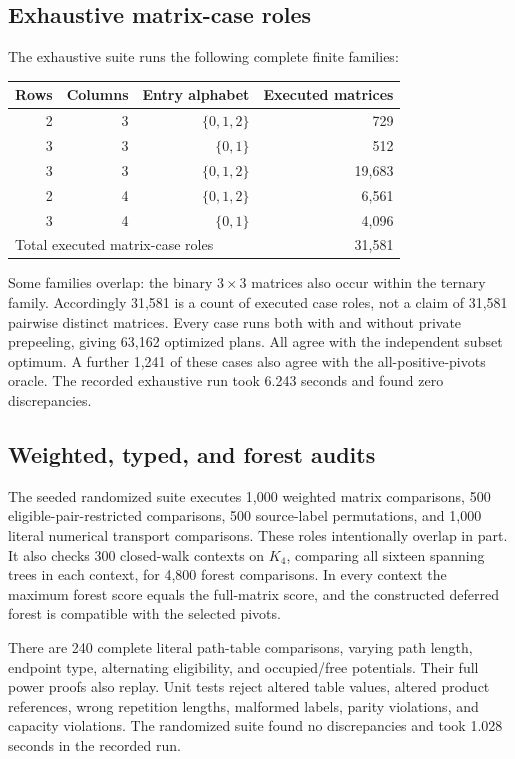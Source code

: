 \documentclass[11pt,letterpaper]{article}
\theoremstyle{definition}
\theoremstyle{remark}
\begin{document}
\subsection{Exhaustive matrix-case roles}
The exhaustive suite runs the following complete finite families:
\begin{center}
\begin{tabular}{rrrr}
\toprule
Rows & Columns & Entry alphabet & Executed matrices \\
\midrule
2 & 3 & $\{0,1,2\}$ & 729 \\
3 & 3 & $\{0,1\}$ & 512 \\
3 & 3 & $\{0,1,2\}$ & 19,683 \\
2 & 4 & $\{0,1,2\}$ & 6,561 \\
3 & 4 & $\{0,1\}$ & 4,096 \\
\midrule
\multicolumn{3}{l}{Total executed matrix-case roles} & 31,581 \\
\bottomrule
\end{tabular}
\end{center}
Some families overlap: the binary $3\times3$ matrices also occur within the ternary family. Accordingly 31,581 is a count of executed case roles, not a claim of 31,581 pairwise distinct matrices. Every case runs both with and without private prepeeling, giving 63,162 optimized plans. All agree with the independent subset optimum. A further 1,241 of these cases also agree with the all-positive-pivots oracle. The recorded exhaustive run took 6.243 seconds and found zero discrepancies.

\subsection{Weighted, typed, and forest audits}
The seeded randomized suite executes 1,000 weighted matrix comparisons, 500 eligible-pair-restricted comparisons, 500 source-label permutations, and 1,000 literal numerical transport comparisons. These roles intentionally overlap in part. It also checks 300 closed-walk contexts on $K_4$, comparing all sixteen spanning trees in each context, for 4,800 forest comparisons. In every context the maximum forest score equals the full-matrix score, and the constructed deferred forest is compatible with the selected pivots.

There are 240 complete literal path-table comparisons, varying path length, endpoint type, alternating eligibility, and occupied/free potentials. Their full power proofs also replay. Unit tests reject altered table values, altered product references, wrong repetition lengths, malformed labels, parity violations, and capacity violations. The randomized suite found no discrepancies and took 1.028 seconds in the recorded run.
\end{document}
